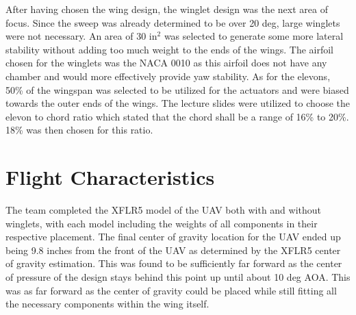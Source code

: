     After having chosen the wing design, the winglet design was the next area of focus. Since the sweep was already determined to be over 20 deg, large winglets were not necessary. An area of 30 in$^2$ was selected to generate some more lateral stability without adding too much weight to the ends of the wings. The airfoil chosen for the winglets was the NACA 0010 as this airfoil does not have any chamber and would more effectively provide yaw stability. As for the elevons, 50\% of the wingspan was selected to be utilized for the actuators and were biased towards the outer ends of the wings. The lecture slides were utilized to choose the elevon to chord ratio which stated that the chord shall be a range of 16\% to 20\%. 18\% was then chosen for this ratio.


\section{Flight Characteristics}

    The team completed the XFLR5 model of the UAV both with and without winglets, with each model including the weights of all components in their respective placement. The final center of gravity location for the UAV ended up being 9.8 inches from the front of the UAV as determined by the XFLR5 center of gravity estimation. This was found to be sufficiently far forward as the center of pressure of the design stays behind this point up until about 10 deg AOA. This was as far forward as the center of gravity could be placed while still fitting all the necessary components within the wing itself. 
    
